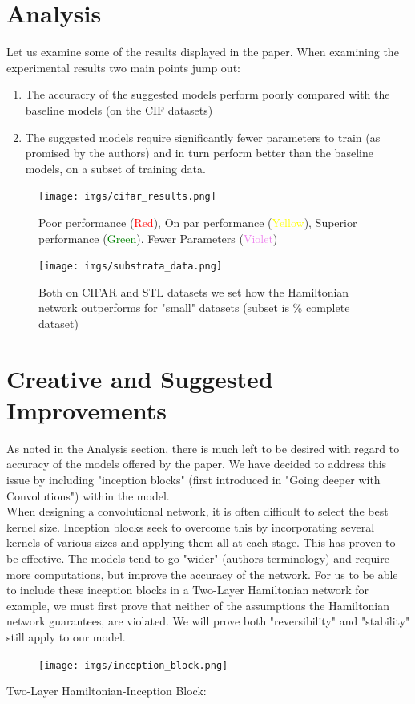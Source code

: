 \documentclass{article}
\theoremstyle{remark}
\begin{document}
\section*{Analysis}
    Let us examine some of the results displayed in the paper. When examining the experimental results two main points jump out:
\begin{enumerate}
    \item The accuracry of the suggested models perform poorly compared with the baseline models (on the CIF datasets)
    \item The suggested models require significantly fewer parameters to train (as promised by the authors) and in turn perform better than the 
    baseline models, on a subset of training data.
\end{enumerate}

\begin{figure}[H]
    \centering
    \texttt{[image: imgs/cifar\_results.png]}
    \caption{Poor performance (\textcolor{red}{Red}), On par performance (\textcolor{yellow}{Yellow}), Superior performance (\textcolor{green}{Green}). Fewer Parameters (\textcolor{violet}{Violet})}
\end{figure}
\begin{figure}[H]
    \centering
    \texttt{[image: imgs/substrata\_data.png]}
    \caption{Both on CIFAR and STL datasets we set how the Hamiltonian network outperforms for "small" datasets (subset is \% complete dataset)}
\end{figure}


\section*{Creative and Suggested Improvements}
    As noted in the Analysis section, there is much left to be desired with regard to accuracy of the models offered by the paper. We have decided to address this issue by including 
"inception blocks" (first introduced in "Going deeper with Convolutions"\cite{C. Szegedy}) within the model. \\
When designing a convolutional network, it is often difficult to select the best kernel size. Inception blocks seek to overcome this by incorporating several kernels of various sizes and 
applying them all at each stage. This has proven to be effective. The models tend to go "wider" (authors terminology) and require more computations, but improve the accuracy of the network. 
For us to be able to include these inception blocks in a Two-Layer Hamiltonian network for example, we must first prove that neither of the assumptions the Hamiltonian network guarantees, 
are violated. We will prove both "reversibility" and "stability" still apply to our model. \\
\begin{figure}[H]
    \centering
    \texttt{[image: imgs/inception\_block.png]}
\end{figure}
Two-Layer Hamiltonian-Inception Block:
\end{document}

